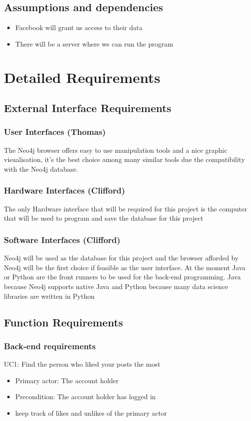 \documentclass[11pt]{article}
\begin{document}
\subsection{Assumptions and dependencies}
\begin{itemize}
\item Facebook will grant us access to their data
\item There will be a server where we can run the program
\end{itemize}

\section{Detailed Requirements}
\subsection{External Interface Requirements}
\subsubsection{User Interfaces (Thomas)}
The Neo4j browser offers easy to use manipulation tools and a nice graphic visualisation, it's the best choice among many similar tools due the compatibility with the Neo4j database.
\subsubsection{Hardware Interfaces (Clifford)}
The only Hardware interface that will be required for this project is the computer that will be used to program and save the database for this project
\subsubsection{Software Interfaces (Clifford)}
Neo4j will be used as the database for this project and the browser afforded by Neo4j will be the first choice if feasible as the user interface. At the moment Java or Python are the front runners to be used for the back-end programming. Java because Neo4j supports native Java and Python because many data science libraries are written in Python

\subsection{Function Requirements}
\subsubsection{Back-end requirements}
UC1: Find the person who liked your posts the most
\begin{itemize}
\item Primary actor: The account holder
\item Precondition: The account holder has logged in
\item keep track of likes and unlikes of the primary actor
\end{itemize}
\end{document}
